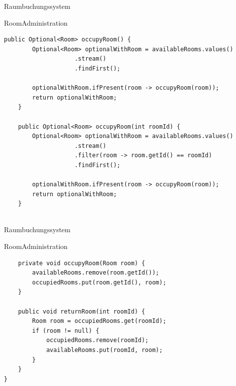 \begin{frame}[fragile]{Raumbuchungssystem}
	\begin{exampleblock}{RoomAdministration}
 		\begin{lstlisting}
public Optional<Room> occupyRoom() {
		Optional<Room> optionalWithRoom = availableRooms.values()
					.stream()
					.findFirst();
		
		optionalWithRoom.ifPresent(room -> occupyRoom(room));
		return optionalWithRoom;
	}
	
	public Optional<Room> occupyRoom(int roomId) {
		Optional<Room> optionalWithRoom = availableRooms.values()
					.stream()
					.filter(room -> room.getId() == roomId)
					.findFirst();
		
		optionalWithRoom.ifPresent(room -> occupyRoom(room));
		return optionalWithRoom;
	}
	
        \end{lstlisting}
 	\end{exampleblock}
\end{frame}

\begin{frame}[fragile]{Raumbuchungssystem}
	\begin{exampleblock}{RoomAdministration}
 		\begin{lstlisting}
	private void occupyRoom(Room room) {
		availableRooms.remove(room.getId());
		occupiedRooms.put(room.getId(), room);
	}
	
	public void returnRoom(int roomId) {
		Room room = occupiedRooms.get(roomId);
		if (room != null) {
			occupiedRooms.remove(roomId);
			availableRooms.put(roomId, room);
		}
	}
}
        \end{lstlisting}
 	\end{exampleblock}
\end{frame}